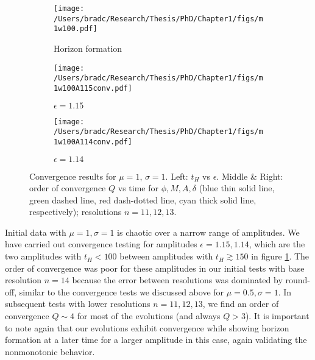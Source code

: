 \documentclass[../PhD.tex]{subfiles}
\begin{document}
\begin{subappendices}
\begin{figure}[!t]
\centering
\begin{subfigure}[t]{0.31\textwidth}
\texttt{[image: /Users/bradc/Research/Thesis/PhD/Chapter1/figs/m1w100.pdf]}
\caption{Horizon formation}
\label{f:m1w100}
\end{subfigure}
\begin{subfigure}[t]{0.31\textwidth}
\texttt{[image: /Users/bradc/Research/Thesis/PhD/Chapter1/figs/m1w100A115conv.pdf]}
\caption{$\epsilon=1.15$}
\label{f:m1w100A115conv}
\end{subfigure}
\begin{subfigure}[t]{0.31\textwidth}
\texttt{[image: /Users/bradc/Research/Thesis/PhD/Chapter1/figs/m1w100A114conv.pdf]}
\caption{$\epsilon=1.14$}
\label{f:m1w100A114conv}
\end{subfigure}
\caption[Order of convergence for $\phi$, $M$, $A$, $\delta$ as a function of time for $\mu = 1$ at nearby amplitudes]{Convergence results for $\mu=1$, $\sigma=1$. Left: $t_H$ vs $\epsilon$.
Middle \& Right: order of convergence $Q$ vs time for $\phi,M,A,\delta$ 
(blue thin solid line, green dashed line, red dash-dotted line, cyan thick 
solid line, respectively); resolutions $n=11,12,13$.
}
\label{f:m1w100convergence}
\end{figure}

Initial data with $\mu=1,\sigma=1$ is chaotic over a narrow range of 
amplitudes.  We have carried out convergence testing for amplitudes 
$\epsilon=1.15,1.14$, which are the two amplitudes with $t_H<100$ between
amplitudes with $t_H\gtrsim 150$ in figure \ref{f:m1w100}.  The order of
convergence was poor for these amplitudes in our initial tests with base
resolution $n=14$ because the error between resolutions was dominated by 
round-off, similar to the convergence tests we discussed above for
$\mu=0.5,\sigma=1$.  In subsequent tests with lower resolutions $n=11,12,13$,
we find an order of convergence $Q\sim 4$ for most of the evolutions
(and always $Q>3$). It is important to note again
that our evolutions exhibit convergence while showing horizon formation at 
a later time for a larger amplitude in this case, again validating the
nonmonotonic behavior.



\end{subappendices}
\end{document}
